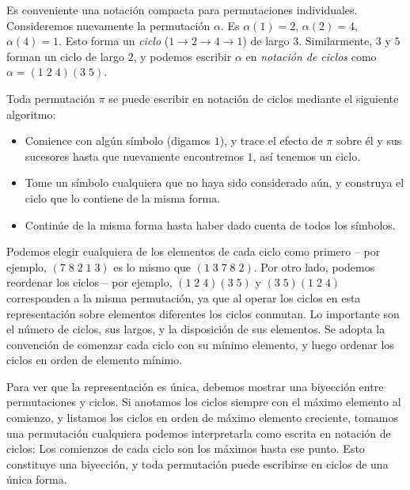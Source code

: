   Es conveniente una notación compacta
  para permutaciones individuales.
  Consideremos nuevamente la permutación \(\alpha\).
  Es \(\alpha(1) = 2\), \(\alpha(2) = 4\), \(\alpha(4) = 1\).
  Esto forma un \emph{ciclo}
  (\(1 \rightarrow 2 \rightarrow 4 \rightarrow 1\))
  de largo \(3\).
  Similarmente,
  \(3\) y \(5\) forman un ciclo de largo \(2\),
  y podemos escribir \(\alpha\) en \emph{notación de ciclos}
  como \(\alpha = (1\;2\;4) (3\;5)\).

  Toda permutación \(\pi\) se puede escribir
  en notación de ciclos mediante el siguiente algoritmo:%
  \begin{itemize}
  \item
    Comience con algún símbolo
    (digamos \(1\)),
    y trace el efecto de \(\pi\) sobre él y sus sucesores
    hasta que nuevamente encontremos \(1\),
    así tenemos un ciclo.
  \item
    Tome un símbolo cualquiera que no haya sido considerado aún,
    y construya el ciclo que lo contiene de la misma forma.
  \item
    Continúe de la misma forma
    hasta haber dado cuenta de todos los símbolos.
  \end{itemize}
  Podemos elegir cualquiera de los elementos
  de cada ciclo como primero --
  por ejemplo,
  \((7\;8\;2\;1\;3)\) es lo mismo que \((1\;3\;7\;8\;2)\).
  Por otro lado,
  podemos reordenar los ciclos --
  por ejemplo,
  \((1\;2\;4)(3\;5)\) y \((3\;5) (1\;2\;4)\)
  corresponden a la misma permutación,
  ya que al operar los ciclos en esta representación
  sobre elementos diferentes los ciclos conmutan.
  Lo importante son el número de ciclos,
  sus largos,
  y la disposición de sus elementos.
  Se adopta la convención
  de comenzar cada ciclo con su mínimo elemento,
  y luego ordenar los ciclos en orden de elemento mínimo.

  Para ver que la representación es única,
  debemos mostrar una biyección entre permutaciones y ciclos.
  Si anotamos los ciclos siempre con el máximo elemento al comienzo,
  y listamos los ciclos en orden de máximo elemento creciente,
  tomamos una permutación cualquiera
  podemos interpretarla como escrita en notación de ciclos:
  Los comienzos de cada ciclo son los máximos hasta ese punto.
  Esto constituye una biyección,%
  y toda permutación puede escribirse en ciclos de una única forma.

